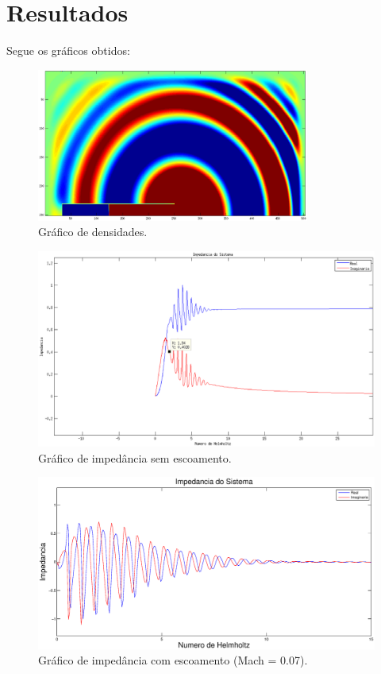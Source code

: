 \section{Resultados}
Segue os gráficos obtidos:
\begin{figure}[h!]
    \centering
    \hspace{-1.5cm}
    \includegraphics[width=0.8\textwidth]{code/simu.eps}
    \caption{Gráfico de densidades.}
\end{figure}
\begin{figure}[h!]
    \centering
    \hspace{-1.5cm}
    \includegraphics[width=1\textwidth]{code/impedancia_sem.eps}
    \caption{Gráfico de impedância sem escoamento.}
\end{figure}

\newpage
\begin{figure}[t!]
    \centering
    \hspace{-1.5cm}
    \includegraphics[width=1\textwidth]{code/impedancia_com.eps}
    \caption{Gráfico de impedância com escoamento (Mach = 0.07).}
\end{figure}


